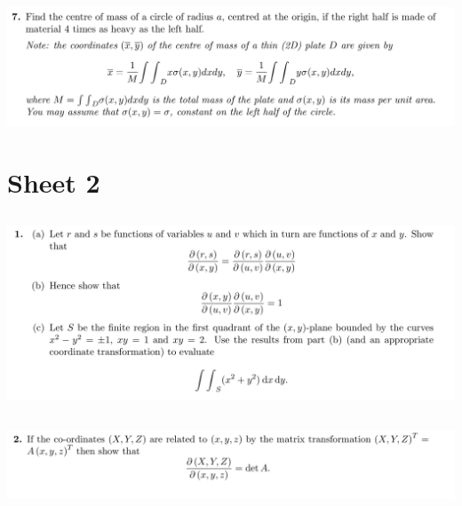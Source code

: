 \documentclass[12pt]{article}
\begin{document}
\subsection{}
\begin{mdframed}
  \includegraphics[width=400pt]{img/oxford-prelims-M5-multivariable-calc-1-7.png}
\end{mdframed}


\newpage
\section{Sheet 2}

\subsection{}
\begin{mdframed}
  \includegraphics[width=400pt]{img/oxford-prelims-M5-multivariable-calc-2-1.png}
\end{mdframed}

\subsection{}
\begin{mdframed}
  \includegraphics[width=400pt]{img/oxford-prelims-M5-multivariable-calc-2-2.png}
\end{mdframed}
\end{document}

